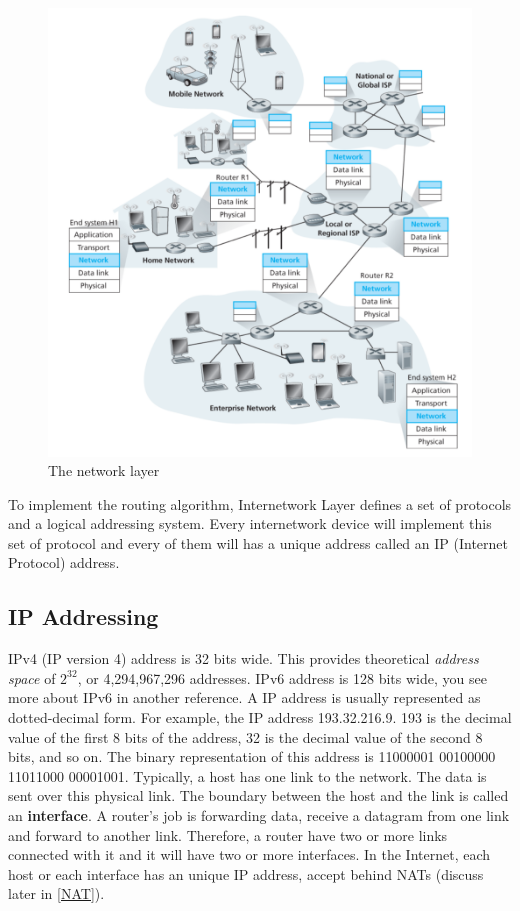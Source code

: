 \documentclass[a4paper, 11pt]{article}
\begin{document}
\begin{figure}[h]
\includegraphics[scale=0.6]{network-layer.png}
\caption{The network layer}
\label{fig:network-layer}
\end{figure}

To implement the routing algorithm, Internetwork Layer defines a set of protocols and a logical addressing system. Every internetwork device will implement this set of protocol and every of them will has a unique address called an IP (Internet Protocol) address. 

\subsection{IP Addressing}

IPv4 (IP version 4) address is 32 bits wide. This provides theoretical \textit{address space} of $2^32$, or 4,294,967,296 addresses. IPv6 address is 128 bits wide, you see more about IPv6 in another reference. A IP address is usually represented as  dotted-decimal form. For example, the IP address 193.32.216.9. 193 is the decimal value of the first 8 bits of the address, 32 is the decimal value of the second 8 bits, and so on. The binary representation of this address is 11000001 00100000 11011000 00001001. Typically, a host has one link to the network. The data is sent over this physical link. The boundary between the host and the link is called an \textbf{interface}. A router's job is forwarding data, receive a datagram from one link and forward to another link. Therefore, a router have two or more links connected with it and it will have two or more interfaces.  In the Internet, each host or each interface has an unique IP address, accept behind NATs (discuss later in \ref{NAT}).\\
\end{document}

